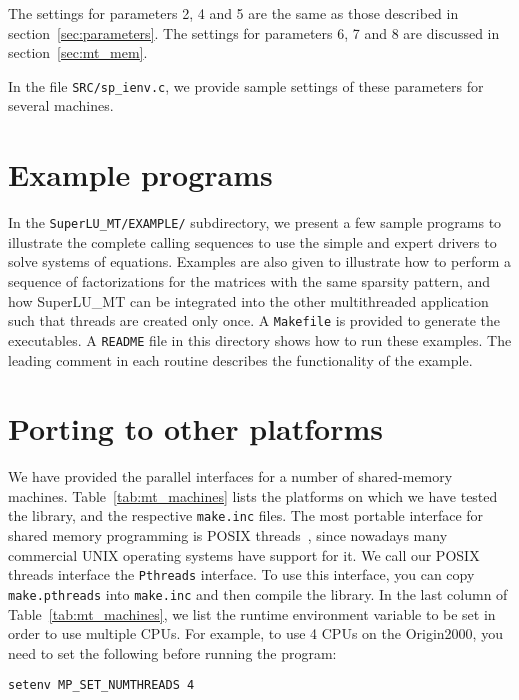 The settings for parameters 2, 4 and 5 are the same
as those described in section~\ref{sec:parameters}.
The settings for parameters 6, 7 and 8 are discussed in
section~\ref{sec:mt_mem}. 

In the file {\tt SRC/sp\_ienv.c}, we provide sample settings of these
parameters for several machines.

\section{Example programs}
In the {\tt SuperLU\_MT/EXAMPLE/} subdirectory, we present a few sample
programs to illustrate the complete calling sequences to use the simple
and expert drivers to solve systems of equations.
Examples are also given to illustrate how to perform a sequence of
factorizations for the matrices with the same sparsity pattern,
and how SuperLU\_MT can be integrated into the other
multithreaded application such that threads are created only once.
A {\tt Makefile} is provided to generate the executables.
A {\tt README} file in this directory shows how to run these examples.
The leading comment in each routine describes the functionality of
the example.


\section{Porting to other platforms}
\label{sec:mt_port}
We have provided the parallel interfaces for a number of shared-memory
machines. 
Table~\ref{tab:mt_machines} lists the platforms on which
we have tested the library, and the respective {\tt make.inc} files.
The most portable interface for shared memory programming is
POSIX threads~\cite{posix}, 
since nowadays many commercial UNIX operating systems have support for it.
We call our POSIX threads interface the {\tt Pthreads} interface. 
To use this interface, you can copy {\tt make.pthreads} into {\tt make.inc}
and then compile the library.
In the last column of Table~\ref{tab:mt_machines}, we list the runtime
environment variable to be set in order to use multiple CPUs.
For example, to use 4 CPUs on the Origin2000, you need to set
the following before running the program:

\vspace{.1in}
{\tt setenv MP\_SET\_NUMTHREADS 4}
\vspace{.1in}


